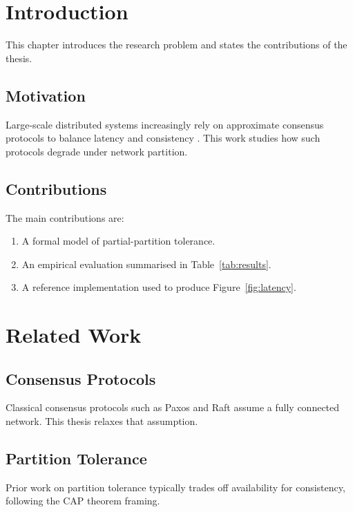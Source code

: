 \chapter{Introduction}
\label{ch:introduction}

This chapter introduces the research problem and states the contributions
of the thesis.

\section{Motivation}

Large-scale distributed systems increasingly rely on approximate
consensus protocols to balance latency and consistency
\citep{lamport1998part}. This work studies how such protocols degrade
under network partition.

\section{Contributions}

The main contributions are:

\begin{enumerate}
  \item A formal model of partial-partition tolerance.
  \item An empirical evaluation summarised in Table~\ref{tab:results}.
  \item A reference implementation used to produce
    Figure~\ref{fig:latency}.
\end{enumerate}

\chapter{Related Work}
\label{ch:related}

\section{Consensus Protocols}

Classical consensus protocols such as Paxos \citep{lamport1998part} and
Raft \citep{ongaro2014search} assume a fully connected network. This
thesis relaxes that assumption.

\section{Partition Tolerance}

Prior work on partition tolerance typically trades off availability for
consistency, following the CAP theorem framing.
